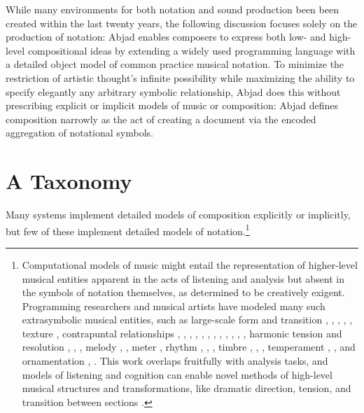 \documentclass{article}
\begin{document}
While many environments for both notation and sound production been been
created within the last twenty years, the following discussion focuses solely
on the production of notation: Abjad enables composers to express both low- and
high-level compositional ideas by extending a widely used programming language
with a detailed object model of common practice musical notation. To minimize
the restriction of artistic thought's infinite possibility while maximizing the
ability to specify elegantly any arbitrary symbolic relationship, Abjad does
this without prescribing explicit or implicit models of music or composition:
Abjad defines composition narrowly as the act of creating a document via the
encoded aggregation of notational symbols.

\section{A Taxonomy} \label{sec:background}

Many systems implement detailed models of composition explicitly or implicitly,
but few of these implement detailed models of notation.\footnote{Computational
models of music might entail the representation of higher-level musical
entities apparent in the acts of listening and analysis but absent in the
symbols of notation themselves, as determined to be creatively exigent.
Programming researchers and musical artists have modeled many such
extrasymbolic musical entities, such as large-scale form and transition
\cite{polansky1991morphological}, \cite{uno1994temporal},
\cite{dobrian1995algorithmic}, \cite{abrams1999higher}, \cite{Yoo1983}, texture
\cite{Horenstein:2004kx}, contrapuntal relationships \cite{Boenn:2009oq},
\cite{Acevedo2005}, \cite{Anders:2011kl}, \cite{Balser:1990tg},
\cite{Jones:2000hc}, \cite{uno1994temporal}, \cite{Bell:1995ij},
\cite{farbood2001analysis}, \cite{Cope:2002fv}, \cite{Laurson:2005dz},
\cite{Polansky:2011fu}, \cite{Ebcioglu:1980kl}, harmonic tension and resolution
\cite{Melo2003}, \cite{Wiggins1999}, \cite{Foster:1995qa}, melody
\cite{Hornel:1993mi}, \cite{Smith:1992pi}, meter \cite{Hamanaka:2005ff}, rhythm
\cite{Nauert2007}, \cite{Degazio:1996lh}, \cite{Collins:2003bs}, timbre
\cite{Xenakis:1991fu}, \cite{Creasey:1996ye}, \cite{Osaka2004}, temperament
\cite{Seymour:2007qo}, \cite{Graf:2006il}, and ornamentation
\cite{Ariza:2003zt}, \cite{Chico-Topfer:1998jl}. This work overlaps fruitfully
with analysis tasks, and models of listening and cognition can enable novel
methods of high-level musical structures and transformations, like dramatic
direction, tension, and transition between sections \cite[108]{Collins2009}.}
\end{document}

